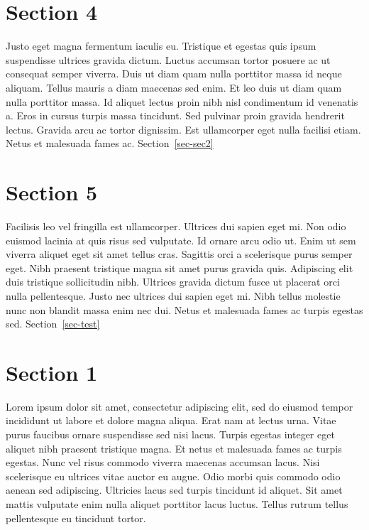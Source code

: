 \documentclass[
  BCOR=10mm, %
  DIV=12, %
  twoside, %
  headsepline, %
  listof=totoc, %
  bibliography=totoc, %
  index=totoc, %
  abstract=true, %
  numbers=noenddot, %
]{cs-thesis}
\begin{document}
    \section{Section 4}\label{section-4}

    Justo eget magna fermentum iaculis eu. Tristique et egestas quis
    ipsum suspendisse ultrices gravida dictum. Luctus accumsan tortor
    posuere ac ut consequat semper viverra. Duis ut diam quam nulla
    porttitor massa id neque aliquam. Tellus mauris a diam maecenas sed
    enim. Et leo duis ut diam quam nulla porttitor massa. Id aliquet
    lectus proin nibh nisl condimentum id venenatis a. Eros in cursus
    turpis massa tincidunt. Sed pulvinar proin gravida hendrerit lectus.
    Gravida arcu ac tortor dignissim. Est ullamcorper eget nulla
    facilisi etiam. Netus et malesuada fames ac. Section~\ref{sec-sec2}

    \section{Section 5}\label{section-5}

    Facilisis leo vel fringilla est ullamcorper. Ultrices dui sapien
    eget mi. Non odio euismod lacinia at quis risus sed vulputate. Id
    ornare arcu odio ut. Enim ut sem viverra aliquet eget sit amet
    tellus cras. Sagittis orci a scelerisque purus semper eget. Nibh
    praesent tristique magna sit amet purus gravida quis. Adipiscing
    elit duis tristique sollicitudin nibh. Ultrices gravida dictum fusce
    ut placerat orci nulla pellentesque. Justo nec ultrices dui sapien
    eget mi. Nibh tellus molestie nunc non blandit massa enim nec dui.
    Netus et malesuada fames ac turpis egestas sed.
    Section~\ref{sec-test}

    \section{Section 1}\label{section-1-1}

    Lorem ipsum dolor sit amet, consectetur adipiscing elit, sed do
    eiusmod tempor incididunt ut labore et dolore magna aliqua. Erat nam
    at lectus urna. Vitae purus faucibus ornare suspendisse sed nisi
    lacus. Turpis egestas integer eget aliquet nibh praesent tristique
    magna. Et netus et malesuada fames ac turpis egestas. Nunc vel risus
    commodo viverra maecenas accumsan lacus. Nisi scelerisque eu
    ultrices vitae auctor eu augue. Odio morbi quis commodo odio aenean
    sed adipiscing. Ultricies lacus sed turpis tincidunt id aliquet. Sit
    amet mattis vulputate enim nulla aliquet porttitor lacus luctus.
    Tellus rutrum tellus pellentesque eu tincidunt tortor.
\end{document}
